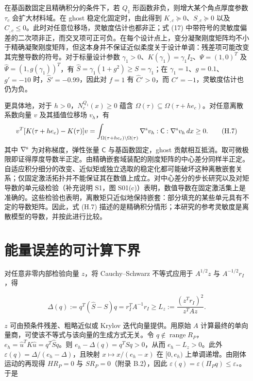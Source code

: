 \documentclass[preprint,12pt,authoryear]{elsarticle}
\begin{document}
在基函数固定且精确积分的条件下，若 \(Q_1\) 形函数非负，则增大某个角点厚度参数 \(\tau_c\) 会扩大材料域。在 ghost 稳定化固定时，由此得到 \(K_{,c}\succeq0\)、\(S_{,c}\succeq0\) 以及 \(C_{,c}\le0\)。此时对任意位移场，灵敏度估计也都非正；式 (17) 中带符号的灵敏度偏差的二次项非正，而交叉项可正可负。在每个设计点上，变分凝聚刚度矩阵均不小于精确凝聚刚度矩阵，但这本身并不保证近似柔度关于设计单调：残差项可能改变其完整导数的符号。对于标量设计参数 \(\gamma_1>0\)、\(K(\gamma_1)=\gamma_1I_2\)、\(\Psi=(1,0)^T\) 及 \(\widehat\Psi=(1,g(\gamma_1))^T\)，有 \(\widehat S=\gamma_1(1+g^2)\ge S=\gamma_1\)；在 \(\gamma_1=1\)、\(g=0.1\)、\(g'=-10\) 时，\(\widehat S'=-0.99\)，因此对 \(f=1\) 有 \(\widehat C'>0\)，而 \(C'=-1\)，灵敏度估计也仍为负。

更具体地，对于 \(h>0\)，\(N_c^{Q_1}(x)\ge0\) 蕴含 \(\Omega(\tau)\subseteq\Omega(\tau+h e_c)\)。对任意离散系数向量 \(v\) 及其插值位移场 \(v_h\)，有
\[
v^T[K(\tau+h e_c)-K(\tau)]v
=\int_{\Omega(\tau+h e_c)\setminus\Omega(\tau)}
\nabla^{\rm s}v_h:\mathsf C:\nabla^{\rm s}v_h\,dx\ge0.
\tag{H.7}
\]
其中 \(\nabla^{\rm s}\) 为对称梯度，弹性张量 \(\mathsf C\) 与基函数固定，ghost 贡献相互抵消。取可微极限即证得厚度导数半正定。由精确嵌套域装配的刚度矩阵的中心差分同样半正定。自适应积分细分的改变、近似矩或独立选取的稳定化都可能破坏这种离散嵌套关系；仅固定激活拓扑并不能保证其在数值上成立。对中心差分的步长研究以及对矩导数的单元级检验（补充说明 S1，图 S01(c)）表明，数值导数在固定激活集上是准确的。这些检验也表明，离散矩只近似地保持嵌套：部分填充的某些单元具有不定的导数矩阵。因此，式 (H.7) 描述的是精确积分情形；本研究的参考灵敏度是离散模型的导数，并按此进行比较。

\section{能量误差的可计算下界}

对任意非零内部检验向量 \(z\)，将 Cauchy--Schwarz 不等式应用于 \(A^{1/2}z\) 与 \(A^{-1/2}r_I\)，得

\[
\Delta(q):=q^T(\widehat S-S)q=r_I^TA^{-1}r_I
\ge L_z:=\frac{(z^Tr_I)^2}{z^TAz}.
\tag{I.1}
\]

\(z\) 可由预条件残差、粗略近似或 Krylov 迭代向量提供。用原始 \(A\) 计算最终的单向量商，可使该不等式与该向量的生成方式无关。令 \(q\notin\operatorname{range}R_P\)，\(e_h=\widehat u^TK\widehat u=q^T\widehat Sq\)。则 \(e_h-\Delta(q)=q^TSq>0\)，从而 \(e_h-L_z>0\)。此外 \(\varepsilon(q)=\Delta/(e_h-\Delta)\)，且映射 \(x\mapsto x/(e_h-x)\) 在 \([0,e_h)\) 上单调递增。由刚体运动的再现得 \(HR_P=0\) 与 \(SR_P=0\)（附录 B.2），因此 \(\varepsilon(q)=\varepsilon(\Pi_Pq)\le\varepsilon_*\)。于是
\end{document}
